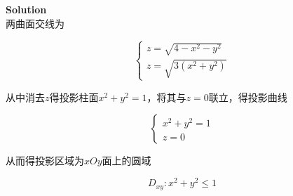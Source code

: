 \documentclass[
	11pt, %
	a4paper, %
]{WhuSakuraBook}
\begin{document}
    \textbf{Solution}
    \\

    两曲面交线为

    $$
        \left\{\begin{array}{l}
        z=\sqrt{4-x^2-y^2} \\
        z=\sqrt{3\left(x^2+y^2\right)}
        \end{array}\right.
    $$

    从中消去\(z\)得投影柱面\(x^2 + y^2 = 1\)，将其与\(z=0\)联立，得投影曲线

    $$
        \left\{\begin{array}{l}
        x^2+y^2=1 \\
        z=0
        \end{array}\right.
    $$

    从而得投影区域为\(xOy\)面上的圆域

    $$
    D_{xy}: x^2 + y^2 \leq 1
    $$

\end{document}
